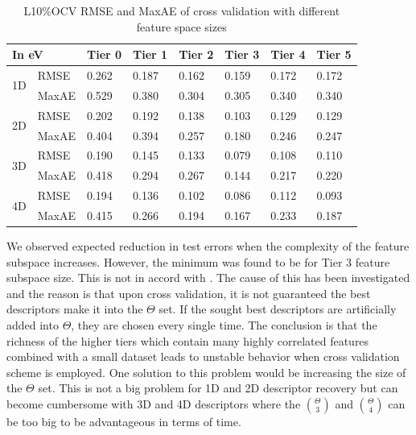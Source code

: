 \documentclass[11pt,oneside,czech,american]{book} %
\theoremstyle{plain}
\theoremstyle{definition}
\begin{document}
\begin{table}[H]
	\centering
	\begin{tabular}{llllllll} 
		\hline
		\multicolumn{2}{l}{In eV } & Tier 0 & Tier 1 & Tier 2 & Tier 3 & Tier 4 & Tier 5  \\ 
		\hline
		\multirow{2}{*}{1D} & RMSE   & 0.262   & 0.187   & 0.162   & 0.159   & 0.172   & 0.172    \\ 
		
		& MaxAE  & 0.529   & 0.380   & 0.304    & 0.305    & 0.340   & 0.340    \\ 
		\hline
		\multirow{2}{*}{2D} & RMSE   & 0.202    & 0.192   & 0.138   & 0.103    & 0.129   & 0.129    \\ 
		
		& MaxAE  & 0.404   & 0.394   & 0.257   & 0.180   & 0.246   & 0.247    \\ 
		\hline
		\multirow{2}{*}{3D} & RMSE   & 0.190   & 0.145   & 0.133   & 0.079   & 0.108   & 0.110    \\ 
		
		& MaxAE  & 0.418   & 0.294   & 0.267   & 0.144   & 0.217   & 0.220    \\ 
		\hline
		\multirow{2}{*}{4D} & RMSE   & 0.194    & 0.136   & 0.102   & 0.086   & 0.112    & 0.093     \\ 
		
		& MaxAE  & 0.415   & 0.266   & 0.194   & 0.167   & 0.233   & 0.187    \\
		\hline
	\end{tabular}
	\caption{L10\%OCV RMSE and MaxAE of cross validation with different feature space sizes}
	\label{feature_space_cv}
\end{table}
We observed expected reduction in test errors when the complexity of the feature subspace increases. However, the minimum was found to be for Tier 3 feature subspace size. This is not in accord with \parencite{ghiringhelli17}. The cause of this has been investigated and the reason is that upon cross validation, it is not guaranteed the best descriptors make it into the $\Theta$ set. If the sought best descriptors are artificially added into $\Theta$, they are chosen every single time. The conclusion is that the richness of the higher tiers which contain many highly correlated features combined with a small dataset leads to unstable behavior when cross validation scheme is employed. One solution to this problem would be increasing the size of the $\Theta$ set. This is not a big problem for 1D and 2D descriptor recovery but can become cumbersome with 3D and 4D descriptors where the $\binom{\Theta}{3}$ and $\binom{\Theta}{4}$ can be too big to be advantageous in terms of time.
\end{document}
